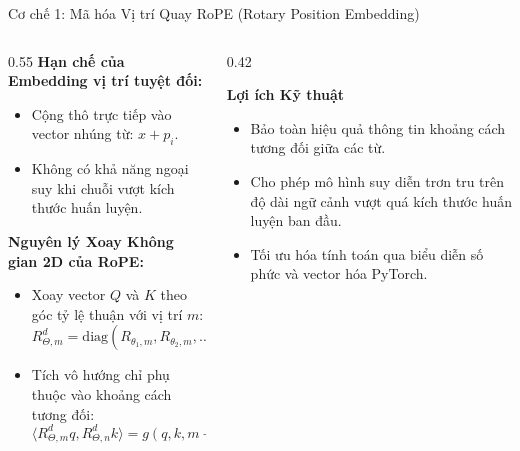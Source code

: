 \documentclass[aspectratio=169, 10pt]{beamer}
\begin{document}
\begin{frame}{Cơ chế 1: Mã hóa Vị trí Quay RoPE (Rotary Position Embedding)}
  \begin{columns}
    \begin{column}{0.55\textwidth}
      \textbf{Hạn chế của Embedding vị trí tuyệt đối:}
      \begin{itemize}
        \item Cộng thô trực tiếp vào vector nhúng từ: $x + p_i$.
        \item Không có khả năng ngoại suy khi chuỗi vượt kích thước huấn luyện.
      \end{itemize}
      \vspace{0.2cm}
      \textbf{Nguyên lý Xoay Không gian 2D của RoPE:}
      \begin{itemize}
        \item Xoay vector $Q$ và $K$ theo góc tỷ lệ thuận với vị trí $m$:
          $$R_{\Theta, m}^d = \text{diag}\left( R_{\theta_1, m}, R_{\theta_2, m}, \dots, R_{\theta_{d/2}, m} \right)$$
        \item Tích vô hướng chỉ phụ thuộc vào khoảng cách tương đối:
          $$\langle R_{\Theta, m}^d q, R_{\Theta, n}^d k \rangle = g(q, k, m - n)$$
      \end{itemize}
    \end{column}
    \begin{column}{0.42\textwidth}
      \begin{exampleblock}{\textbf{Lợi ích Kỹ thuật}}
        \begin{itemize}
          \item Bảo toàn hiệu quả thông tin khoảng cách tương đối giữa các từ.
          \item Cho phép mô hình suy diễn trơn tru trên độ dài ngữ cảnh vượt quá kích thước huấn luyện ban đầu.
          \item Tối ưu hóa tính toán qua biểu diễn số phức và vector hóa PyTorch.
        \end{itemize}
      \end{exampleblock}
    \end{column}
  \end{columns}
\end{frame}
\end{document}
